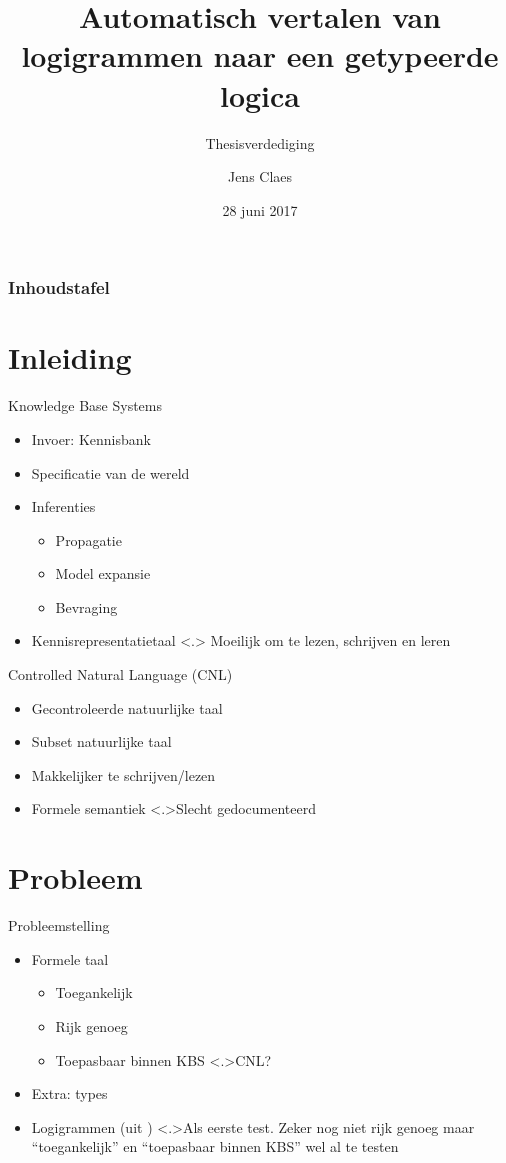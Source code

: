 \documentclass[notes, dvipsnames]{beamer}
\title{Automatisch vertalen van logigrammen naar een getypeerde logica}
\subtitle{Thesisverdediging}
\author{Jens Claes}
\date{28 juni 2017}
\newcommand{\seperation}{
	\vspace{1em}
	\ppause
}
\newcommand{\hitem}{
	\ppause
	\item
}
\newcommand{\ppause}{\onslide<+>}
\newcommand{\nnote}[1]{\note<.>{#1}}
\begin{document}
	\frame{\titlepage}

  \begin{frame}
    \frametitle{Inhoudstafel}
    \tableofcontents[hidesubsections] 
  \end{frame}

  \section{Inleiding}
	\begin{frame}{Knowledge Base Systems}
		\begin{itemize}
      \hitem Invoer: Kennisbank
      \item Specificatie van de wereld

			\seperation
      \item Inferenties \cite{idp}
        \begin{itemize}
          \hitem Propagatie
          \hitem Model expansie
          \hitem Bevraging
        \end{itemize}

      \seperation
      \item Kennisrepresentatietaal
      \nnote{
        Moeilijk om te lezen, schrijven en leren
      }
		\end{itemize}
	\end{frame}

	\begin{frame}{Controlled Natural Language (CNL)}
		\begin{itemize}
      \hitem Gecontroleerde natuurlijke taal
      \item Subset natuurlijke taal

      \seperation
      \item Makkelijker te schrijven/lezen
      \hitem Formele semantiek
      \nnote{Slecht gedocumenteerd}
		\end{itemize}
	\end{frame}

	\section{Probleem}
	\begin{frame}{Probleemstelling}
		\begin{itemize}
      \hitem Formele taal
        \begin{itemize}
          \hitem Toegankelijk
          \item Rijk genoeg
          \item Toepasbaar binnen KBS
          \nnote{CNL?}
        \end{itemize}

      \seperation
      \item Extra: types

      \seperation
      \item Logigrammen (uit \cite{logigrammen})
        \nnote{Als eerste test. Zeker nog niet rijk genoeg maar ``toegankelijk'' en ``toepasbaar binnen KBS'' wel al te testen}
		\end{itemize}
	\end{frame}
\end{document}
